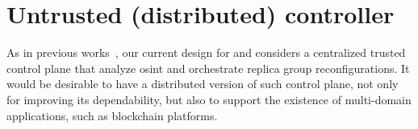 \chapter{Untrusted (distributed) controller}
\label{chap:controler}

As in previous works~\cite{Roeder:2010,Platania:2014}, our current design for \sieveq and \system considers a centralized trusted control plane that analyze \gls{osint} and orchestrate replica group reconfigurations.
It would be desirable to have a distributed version of such control plane, not only for improving its dependability, but also to support the existence of multi-domain applications, such as blockchain platforms.

